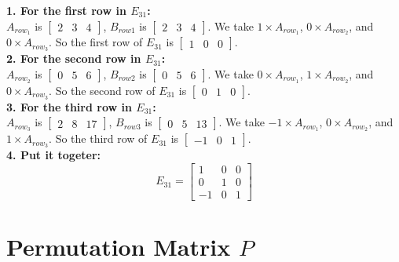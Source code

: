 \begin{mdframed}
    \baselineskip
    \noindent \textbf{1. For the first row in $E_{31}$:} \\
    $A_{row_{1}}$ is $\begin{bmatrix}
            2 & 3 & 4
        \end{bmatrix}$, $B_{row{1}}$ is $\begin{bmatrix}
            2 & 3 & 4
        \end{bmatrix}$. We take $1 \times A_{row_{1}}$, $0 \times A_{row_{2}}$, and $0 \times A_{row_{3}}$. So the first row of $E_{31}$ is $\begin{bmatrix}
            1 & 0 & 0
        \end{bmatrix}$. \\
    \noindent \textbf{2. For the second row in $E_{31}$:} \\
    $A_{row_{2}}$ is $\begin{bmatrix}
            0 & 5 & 6
        \end{bmatrix}$, $B_{row{2}}$ is $\begin{bmatrix}
            0 & 5 & 6
        \end{bmatrix}$. We take $0 \times A_{row_{1}}$, $1 \times A_{row_{2}}$, and $0 \times A_{row_{3}}$. So the second row of $E_{31}$ is $\begin{bmatrix}
            0 & 1 & 0
        \end{bmatrix}$. \\
    \noindent \textbf{3. For the third row in $E_{31}$:} \\
    $A_{row_{3}}$ is $\begin{bmatrix}
            2 & 8 & 17
        \end{bmatrix}$, $B_{row{3}}$ is $\begin{bmatrix}
            0 & 5 & 13
        \end{bmatrix}$. We take $-1 \times A_{row_{1}}$, $0 \times A_{row_{2}}$, and $1 \times A_{row_{3}}$. So the third row of $E_{31}$ is $\begin{bmatrix}
            -1 & 0 & 1
        \end{bmatrix}$. \\
    \noindent \textbf{4. Put it togeter:}
    \[
        E_{31} =
        \begin{bmatrix}
            1  & 0 & 0 \\
            0  & 1 & 0 \\
            -1 & 0 & 1
        \end{bmatrix}
    \]
\end{mdframed}

\section{Permutation Matrix $P$}
